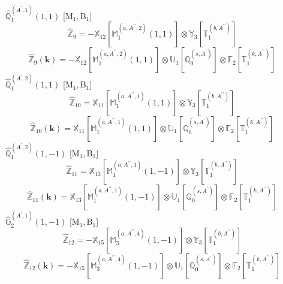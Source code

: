 \documentclass[fleqn,10pt,landscape]{article}
\begin{document}
\begin{itemize}
\noindent {} $\,\,\,\hat{\mathbb{Q}}_{1}^{(A^{\prime},1)}(1,1)$ [M$_{1}$,\,B$_{1}$]
\begin{dmath*}
\hat{\mathbb{Z}}_{9}=- \mathbb{X}_{12}[\mathbb{M}_{1}^{(a,A^{\prime\prime},2)}(1,1)] \otimes\mathbb{Y}_{3}[\mathbb{T}_{1}^{(b,A^{\prime\prime})}]
\end{dmath*}
\begin{dmath*}
\hat{\mathbb{Z}}_{9}(\bm{k})=- \mathbb{X}_{12}[\mathbb{M}_{1}^{(a,A^{\prime\prime},2)}(1,1)] \otimes\mathbb{U}_{1}[\mathbb{Q}_{0}^{(s,A^{\prime})}] \otimes\mathbb{F}_{2}[\mathbb{T}_{1}^{(k,A^{\prime\prime})}]
\end{dmath*}
\vspace{4mm}
\noindent {} $\,\,\,\hat{\mathbb{Q}}_{1}^{(A^{\prime},2)}(1,1)$ [M$_{1}$,\,B$_{1}$]
\begin{dmath*}
\hat{\mathbb{Z}}_{10}=\mathbb{X}_{11}[\mathbb{M}_{1}^{(a,A^{\prime\prime},1)}(1,1)] \otimes\mathbb{Y}_{3}[\mathbb{T}_{1}^{(b,A^{\prime\prime})}]
\end{dmath*}
\begin{dmath*}
\hat{\mathbb{Z}}_{10}(\bm{k})=\mathbb{X}_{11}[\mathbb{M}_{1}^{(a,A^{\prime\prime},1)}(1,1)] \otimes\mathbb{U}_{1}[\mathbb{Q}_{0}^{(s,A^{\prime})}] \otimes\mathbb{F}_{2}[\mathbb{T}_{1}^{(k,A^{\prime\prime})}]
\end{dmath*}
\vspace{4mm}
\noindent {} $\,\,\,\hat{\mathbb{Q}}_{1}^{(A^{\prime},2)}(1,-1)$ [M$_{1}$,\,B$_{1}$]
\begin{dmath*}
\hat{\mathbb{Z}}_{11}=\mathbb{X}_{13}[\mathbb{M}_{1}^{(a,A^{\prime\prime},1)}(1,-1)] \otimes\mathbb{Y}_{3}[\mathbb{T}_{1}^{(b,A^{\prime\prime})}]
\end{dmath*}
\begin{dmath*}
\hat{\mathbb{Z}}_{11}(\bm{k})=\mathbb{X}_{13}[\mathbb{M}_{1}^{(a,A^{\prime\prime},1)}(1,-1)] \otimes\mathbb{U}_{1}[\mathbb{Q}_{0}^{(s,A^{\prime})}] \otimes\mathbb{F}_{2}[\mathbb{T}_{1}^{(k,A^{\prime\prime})}]
\end{dmath*}
\vspace{4mm}
\noindent {} $\,\,\,\hat{\mathbb{G}}_{2}^{(A^{\prime},1)}(1,-1)$ [M$_{1}$,\,B$_{1}$]
\begin{dmath*}
\hat{\mathbb{Z}}_{12}=- \mathbb{X}_{15}[\mathbb{M}_{3}^{(a,A^{\prime\prime},4)}(1,-1)] \otimes\mathbb{Y}_{3}[\mathbb{T}_{1}^{(b,A^{\prime\prime})}]
\end{dmath*}
\begin{dmath*}
\hat{\mathbb{Z}}_{12}(\bm{k})=- \mathbb{X}_{15}[\mathbb{M}_{3}^{(a,A^{\prime\prime},4)}(1,-1)] \otimes\mathbb{U}_{1}[\mathbb{Q}_{0}^{(s,A^{\prime})}] \otimes\mathbb{F}_{2}[\mathbb{T}_{1}^{(k,A^{\prime\prime})}]

\end{dmath*}
\end{itemize}
\end{document}
